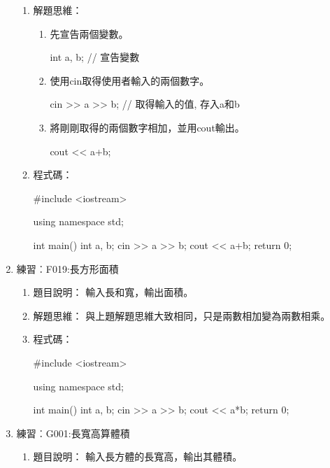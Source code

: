 \begin{enumerate}
\begin{enumerate}
			\item 解題思維：
			\begin{enumerate}
			\item 先宣告兩個變數。
			\begin{inside}
			int a, b; // 宣告變數
			\end{inside}
			\item 使用cin取得使用者輸入的兩個數字。
			\begin{inside}
			cin >> a >> b; // 取得輸入的值, 存入a和b
			\end{inside}
			\item 將剛剛取得的兩個數字相加，並用cout輸出。
			\begin{inside}
			cout << a+b;
			\end{inside}
			\end{enumerate} 
			
			\item 程式碼：
			\begin{cppcode}
				#include <iostream>
				
				using namespace std;
				
				int main()
				{
					int a, b;
					cin >> a >> b;
					cout << a+b;
					return 0;	
				}
			\end{cppcode}
		\end{enumerate}
		
	\item 練習︰F019:長方形面積%
		\begin{enumerate}
			\item 題目說明：
			\subitem 輸入長和寬，輸出面積。
			
			\item 解題思維：
			\subitem 與上題解題思維大致相同，只是兩數相加變為兩數相乘。
			
			\item 程式碼：
			\begin{cppcode}
				#include <iostream>
				
				using namespace std;
				
				int main()
				{
					int a, b;
					cin >> a >> b;
					cout << a*b;
					return 0;	
				}
			\end{cppcode}
		\end{enumerate}
		
	\item 練習︰G001:長寬高算體積
		\begin{enumerate}
			\item 題目說明：
			\subitem 輸入長方體的長寬高，輸出其體積。
			

\end{enumerate}
\end{enumerate}
